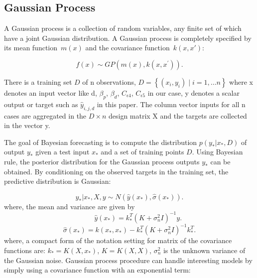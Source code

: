 \subsection{Gaussian Process}

A Gaussian process is a collection of random variables, any finite set of which have a joint Gaussian distribution. A Gaussian process is completely specified by its mean function $m(x)$ and the covariance function $k(x,x′)$:

\begin{equation}
\label{mean function}
f({x})\sim GP(m({x}), k({x}, {x}^{\prime})). 
\end{equation}

There is a training set $D$ of n observations, $
D=\left \{ (x_{i},y_{i})\mid  i=1,…n \right \}
$ where x denotes an input vector like d, $\beta_{p}$, $\beta_{d}$, $C_{\epsilon4}$, $C_{\epsilon5}$ in our case, y denotes a scalar output or target such as $\hat{y}_{i,j,d}$ in this paper. The column vector inputs for all n cases are aggregated in the $D×n$ design matrix X and the targets are collected in the vector y.

The goal of Bayesian forecasting is to compute the distribution $p(y_{\ast}| x_{\ast} ,D)$ of output $y_{\ast}$  given a test input $x_{\ast}$ and a set of training points $D$. Using Bayesian rule, the posterior distribution for the Gaussian process outputs $y_{\ast}$ can be obtained. By conditioning on the observed targets in the training set, the predictive distribution is Gaussian:

\begin{equation}
\label{eq:gaussian distribution}
y_{\ast}\vert { x}_{\ast},{X},{y}\sim N(\hat{y}({ x}_{\ast}),\hat{\sigma}({ x}_{\ast})). 
\end{equation}
where, the mean and variance are given by
\begin{equation}
\label{eq:mean}
\qquad \ \ \hat{y}({x}_{\ast})={k}_{\ast}^{T}({ K}+\sigma_{n}^{2}{I})^{-1}{y}. 
\end{equation}
\begin{equation}
\label{eq:variance}
\hat{\sigma}({ x}_{\ast})= k({x}_{\ast},{x}_{\ast})-{ k}_{\ast}^{T}({ K}+\sigma_{n}^{2}{ I})^{-1}{ k}_{\ast}^{T}.
\end{equation}
where, a compact form of the notation setting for matrix of the covariance functions are: $k_{\ast}=K(X,x_{\ast})$, 
$K=K(X,X)$, $\sigma _{n}^{2}$ is the unknown variance of the Gaussian noise.
Gaussian process procedure can handle interesting models by simply using a covariance function with an exponential term:

